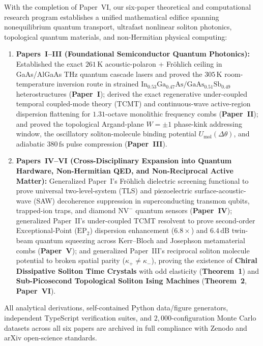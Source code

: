 \documentclass[11pt,letterpaper]{article}
\begin{document}
With the completion of Paper~VI, our six-paper theoretical and computational research program establishes a unified mathematical edifice spanning nonequilibrium quantum transport, ultrafast nonlinear soliton photonics, topological quantum materials, and non-Hermitian physical computing:
\begin{enumerate}
    \item \textbf{Papers~I--III (Foundational Semiconductor Quantum Photonics):} Established the exact $261\,\mathrm{K}$ acoustic-polaron + Fr\"ohlich ceiling in GaAs/AlGaAs THz quantum cascade lasers and proved the $305\,\mathrm{K}$ room-temperature inversion route in strained $\mathrm{In}_{0.53}\mathrm{Ga}_{0.47}\mathrm{As}/\mathrm{GaAs}_{0.51}\mathrm{Sb}_{0.49}$ heterostructures (\textbf{Paper~I}); derived the exact regenerative under-coupled temporal coupled-mode theory (TCMT) and continuous-wave active-region dispersion flattening for $1.31$-octave monolithic frequency combs (\textbf{Paper~II}); and proved the topological Argand-plane $W = \pm 1$ phase-kink addressing window, the oscillatory soliton-molecule binding potential $U_{\mathrm{mol}}(\Delta\theta)$, and adiabatic $380\,\mathrm{fs}$ pulse compression (\textbf{Paper~III}).
    \item \textbf{Papers~IV--VI (Cross-Disciplinary Expansion into Quantum Hardware, Non-Hermitian QED, and Non-Reciprocal Active Matter):} Generalized Paper~I's Fr\"ohlich dielectric screening functional to prove universal two-level-system (TLS) and piezoelectric surface-acoustic-wave (SAW) decoherence suppression in superconducting transmon qubits, trapped-ion traps, and diamond $\mathrm{NV}^-$ quantum sensors (\textbf{Paper~IV}); generalized Paper~II's under-coupled TCMT resolvent to prove second-order Exceptional-Point ($\mathrm{EP}_2$) dispersion enhancement ($6.8\times$) and $6.4\,\mathrm{dB}$ twin-beam quantum squeezing across Kerr--Bloch and Josephson metamaterial combs (\textbf{Paper~V}); and generalized Paper~III's reciprocal soliton molecule potential to broken spatial parity ($\kappa_+ \neq \kappa_-$), proving the existence of \textbf{Chiral Dissipative Soliton Time Crystals} with odd elasticity (\textbf{Theorem~1}) and \textbf{Sub-Picosecond Topological Soliton Ising Machines} (\textbf{Theorem~2}, \textbf{Paper~VI}).
\end{enumerate}
All analytical derivations, self-contained Python data/figure generators, independent TypeScript verification suites, and $2{,}000$-configuration Monte Carlo datasets across all six papers are archived in full compliance with Zenodo and arXiv open-science standards.
\end{document}

